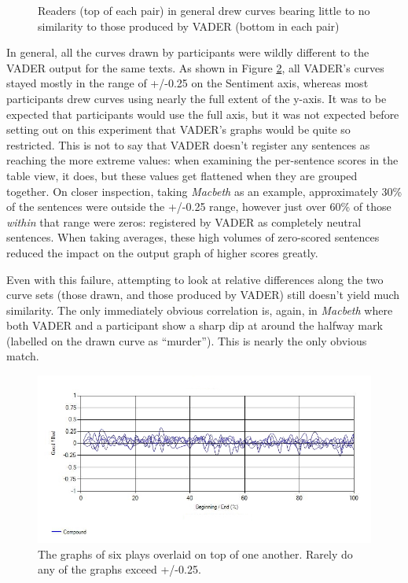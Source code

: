 \documentclass{article}
\begin{document}
{\begin{figure}[htbp]
                \centering
                \caption{Readers (top of each pair) in general drew curves bearing little to no similarity to those produced by VADER (bottom in each pair)}
                \label{fig:readerVsVader}
            \end{figure}
            In general, all the curves drawn by participants were wildly different to the VADER output for the same texts. As shown in Figure \ref{fig:ShakespeareOverlaid}, all VADER's curves stayed mostly in the range of +/-0.25 on the Sentiment axis, whereas most participants drew curves using nearly the full extent of the y-axis. It was to be expected that participants would use the full axis, but it was not expected before setting out on this experiment that VADER's graphs would be quite so restricted. This is not to say that VADER doesn't register any sentences as reaching the more extreme values: when examining the per-sentence scores in the table view, it does, but these values get flattened when they are grouped together. On closer inspection, taking \textit{Macbeth} as an example, approximately 30\% of the sentences were outside the +/-0.25 range, however  just over 60\% of those \textit{within} that range were zeros: registered by VADER as completely neutral sentences. When taking averages, these high volumes of zero-scored sentences reduced the impact on the output graph of higher scores greatly.

            Even with this failure, attempting to look at relative differences along the two curve sets (those drawn, and those produced by VADER) still doesn't yield much similarity. The only immediately obvious correlation is, again, in \textit{Macbeth} where both VADER and a participant show a sharp dip at around the halfway mark (labelled on the drawn curve as ``murder''). This is nearly the only obvious match.
            
            \begin{figure}
                \includegraphics[width=1\textwidth]{Figures/Curve/ShakespeareOverlaid}
                \centering
                \caption{The graphs of six plays overlaid on top of one another. Rarely do any of the graphs exceed +/-0.25.} 
                \label{fig:ShakespeareOverlaid}
            \end{figure}

}
\end{document}
